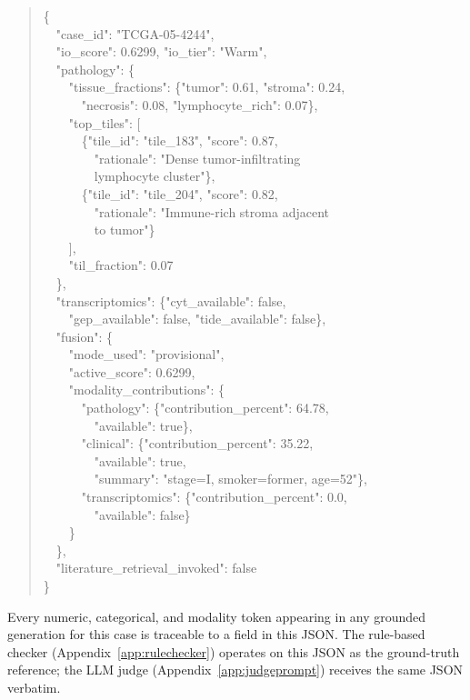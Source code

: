 \documentclass[11pt]{article}
\begin{document}
\begin{quote}\footnotesize\ttfamily
\{\\
~~"case\_id": "TCGA-05-4244",\\
~~"io\_score": 0.6299, "io\_tier": "Warm",\\
~~"pathology": \{\\
~~~~"tissue\_fractions": \{"tumor": 0.61, "stroma": 0.24,\\
~~~~~~"necrosis": 0.08, "lymphocyte\_rich": 0.07\},\\
~~~~"top\_tiles": [\\
~~~~~~\{"tile\_id": "tile\_183", "score": 0.87,\\
~~~~~~~~"rationale": "Dense tumor-infiltrating\\
~~~~~~~~lymphocyte cluster"\},\\
~~~~~~\{"tile\_id": "tile\_204", "score": 0.82,\\
~~~~~~~~"rationale": "Immune-rich stroma adjacent\\
~~~~~~~~to tumor"\}\\
~~~~],\\
~~~~"til\_fraction": 0.07\\
~~\},\\
~~"transcriptomics": \{"cyt\_available": false,\\
~~~~"gep\_available": false, "tide\_available": false\},\\
~~"fusion": \{\\
~~~~"mode\_used": "provisional",\\
~~~~"active\_score": 0.6299,\\
~~~~"modality\_contributions": \{\\
~~~~~~"pathology": \{"contribution\_percent": 64.78,\\
~~~~~~~~"available": true\},\\
~~~~~~"clinical": \{"contribution\_percent": 35.22,\\
~~~~~~~~"available": true,\\
~~~~~~~~"summary": "stage=I, smoker=former, age=52"\},\\
~~~~~~"transcriptomics": \{"contribution\_percent": 0.0,\\
~~~~~~~~"available": false\}\\
~~~~\}\\
~~\},\\
~~"literature\_retrieval\_invoked": false\\
\}
\end{quote}

Every numeric, categorical, and modality token appearing in any grounded generation for this case is traceable to a field in this JSON. The rule-based checker (Appendix~\ref{app:rulechecker}) operates on this JSON as the ground-truth reference; the LLM judge (Appendix~\ref{app:judgeprompt}) receives the same JSON verbatim.
\end{document}
